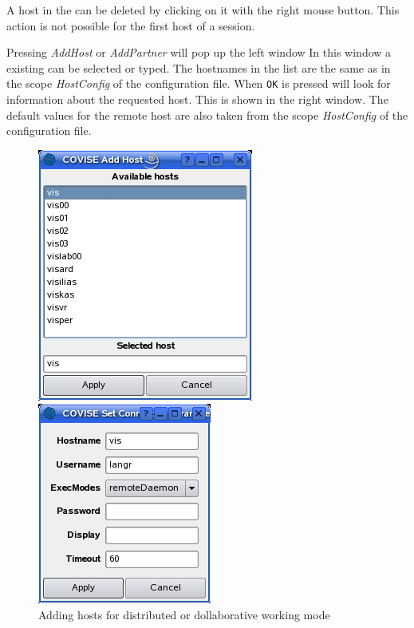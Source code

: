 \begin{itemize}
    A host in the {\mymodulebrowser} can be deleted  by clicking on it with the right mouse button. This 
    action is not possible for the first host of a {\covise} session.
	 
	 Pressing {\it AddHost} or {\it AddPartner} will pop up the left 
    window   In this window  
	 a existing can be selected or typed. The hostnames in the list are the same as in the 
	 scope {\it HostConfig} of the {\covise}  configuration file. When \verb+OK+ is pressed 
	 {\covise} will look for information about the requested host.
	 This is shown in the right window. 
	 The default values for the remote host are also taken from the scope {\it HostConfig} of the configuration file. 


    
 
	  \latexonly
	  \begin{figure}[!htbp]
	  \hspace{3cm}
	  \begin{minipage}[b]{.4\linewidth}
   	 \includegraphics[scale=0.5]{mapeditor/pict/addhost1}
	  \end{minipage}
	  \hspace{1cm}
	  \begin{minipage}[b]{.4\linewidth}
   	 \includegraphics[scale=0.5]{mapeditor/pict/addhost2}
	  \end{minipage}
	  \caption{Adding hosts for distributed or dollaborative working mode}
	  \label{fighost}
	  \end{figure}
	  \endlatexonly

	 \end{itemize}

